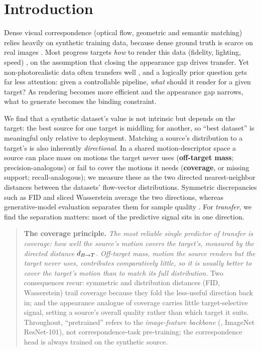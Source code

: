 \section{Introduction}
\label{sec:intro}

Dense visual correspondence (optical flow, geometric and semantic matching)
relies heavily on synthetic training data, because dense ground truth is scarce
on real images
\cite{mayer2016FlyingThingsDataset,sintel,greff2021kubric,pointodyssey}. Most
progress targets \emph{how} to render this data (fidelity, lighting, speed)
\cite{greff2021kubric,pointodyssey}, on the assumption that closing the
appearance gap drives transfer. Yet non-photorealistic data often transfers well
\cite{Baradad2021LookingAtNoise,white2009mandelbulb}, and a logically prior
question gets far less attention: given a controllable pipeline, \emph{what}
should it render for a given target? As rendering becomes more efficient and the
appearance gap narrows, what to generate becomes the binding constraint.

We find that a synthetic dataset's value is not intrinsic but depends on the
target: the best source for one target is middling for another, so ``best
dataset'' is meaningful only relative to deployment. Matching a source's
distribution to a target's is also inherently \emph{directional}. In a shared
motion-descriptor space a source can place mass on motions the target never uses
(\textbf{off-target mass}; precision-analogous) or fail to cover the motions it
needs (\textbf{coverage}, or missing support; recall-analogous); we measure these
as the two directed nearest-neighbor distances between the datasets' flow-vector
distributions. Symmetric discrepancies such as FID
\cite{heusel2018ganstrainedtimescaleupdate} and sliced Wasserstein average the
two directions, whereas generative-model evaluation separates them for sample
quality \cite{sajjadi2018assessing_precision_recall,kynkaanniemi2019improved_pr}.
For \emph{transfer}, we find the separation matters: most of the predictive
signal sits in one direction.

\begin{quote}
\textbf{The coverage principle.} \emph{The most reliable single predictor of
transfer is \emph{coverage}: how well the source's motion covers the target's,
measured by the directed distance $d_{B\to T}$. Off-target mass, motion the source renders but the target never uses,
contributes comparatively little, so it is usually better to \emph{cover} the
target's motion than to \emph{match} its full distribution.}
Two consequences recur: symmetric and distribution distances (FID, Wasserstein)
trail coverage because they fold the less-useful direction back in; and the
appearance analogue of coverage carries little target-selective signal, setting a
source's overall quality rather than which target it suits. Throughout,
``pretrained'' refers to the \emph{image-feature backbone} (\eg, ImageNet
ResNet-101), not correspondence-task pre-training; the correspondence head is
always trained on the synthetic source.
\end{quote}


